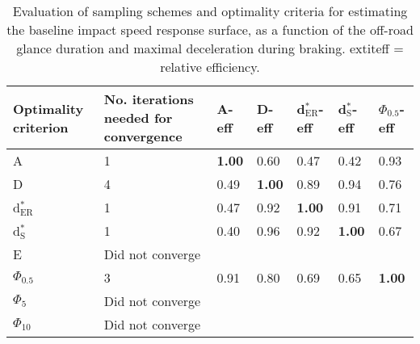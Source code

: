 \begin{table}[htb!]
\centering
\caption{Evaluation of sampling schemes and optimality criteria for estimating the baseline impact speed response surface, as a function of the off-road glance duration and maximal deceleration during braking. 	extit{eff = relative efficiency.}} 
\label{tab:impact_speed_response_surface}
\begin{tabular}{p{2.75cm}R{3.125cm}R{1.5cm}R{1.5cm}R{1.5cm}R{1.5cm}R{1.5cm}}
 Optimality criterion & No. iterations needed for convergence & A-eff & D-eff & d$^*_{\mathrm{ER}}$-eff & d$^*_{\mathrm{S}}$-eff & $\Phi_{0.5}$-eff \\ 
  \hline
A & 1 & \textbf{1.00} & 0.60 & 0.47 & 0.42 & 0.93 \\ 
  D & 4 & 0.49 & \textbf{1.00} & 0.89 & 0.94 & 0.76 \\ 
  d$^*_{\mathrm{ER}}$ & 1 & 0.47 & 0.92 & \textbf{1.00} & 0.91 & 0.71 \\ 
  d$^*_{\mathrm{S}}$ & 1 & 0.40 & 0.96 & 0.92 & \textbf{1.00} & 0.67 \\ 
  E & Did not converge &  &  &  &  &  \\ 
  $\Phi_{0.5}$ & 3 & 0.91 & 0.80 & 0.69 & 0.65 & \textbf{1.00} \\ 
  $\Phi_5$ & Did not converge &  &  &  &  &  \\ 
  $\Phi_{10}$ & Did not converge &  &  &  &  &  \\ 
   \hline
\end{tabular}
\end{table}
